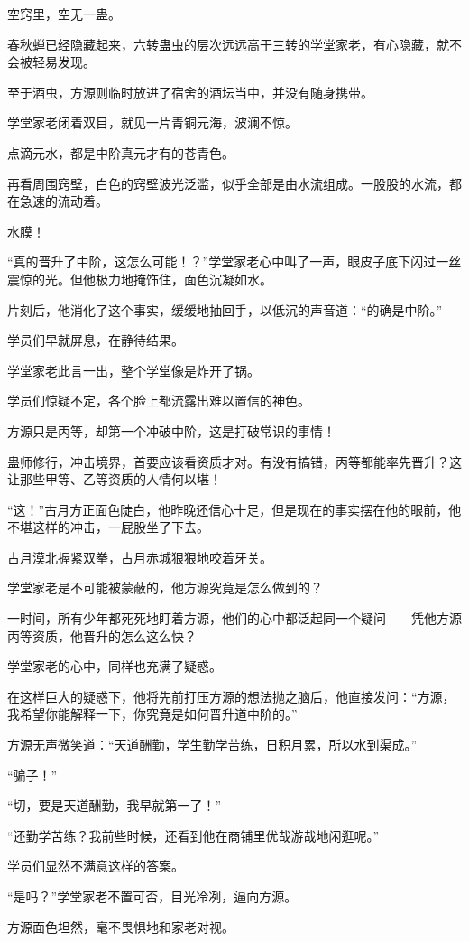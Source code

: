 \begin{this_body}
空窍里，空无一蛊。

春秋蝉已经隐藏起来，六转蛊虫的层次远远高于三转的学堂家老，有心隐藏，就不会被轻易发现。

至于酒虫，方源则临时放进了宿舍的酒坛当中，并没有随身携带。

学堂家老闭着双目，就见一片青铜元海，波澜不惊。

点滴元水，都是中阶真元才有的苍青色。

再看周围窍壁，白色的窍壁波光泛滥，似乎全部是由水流组成。一股股的水流，都在急速的流动着。

水膜！

“真的晋升了中阶，这怎么可能！？”学堂家老心中叫了一声，眼皮子底下闪过一丝震惊的光。但他极力地掩饰住，面色沉凝如水。

片刻后，他消化了这个事实，缓缓地抽回手，以低沉的声音道：“的确是中阶。”

学员们早就屏息，在静待结果。

学堂家老此言一出，整个学堂像是炸开了锅。

学员们惊疑不定，各个脸上都流露出难以置信的神色。

方源只是丙等，却第一个冲破中阶，这是打破常识的事情！

蛊师修行，冲击境界，首要应该看资质才对。有没有搞错，丙等都能率先晋升？这让那些甲等、乙等资质的人情何以堪！

“这！”古月方正面色陡白，他昨晚还信心十足，但是现在的事实摆在他的眼前，他不堪这样的冲击，一屁股坐了下去。

古月漠北握紧双拳，古月赤城狠狠地咬着牙关。

学堂家老是不可能被蒙蔽的，他方源究竟是怎么做到的？

一时间，所有少年都死死地盯着方源，他们的心中都泛起同一个疑问――凭他方源丙等资质，他晋升的怎么这么快？

学堂家老的心中，同样也充满了疑惑。

在这样巨大的疑惑下，他将先前打压方源的想法抛之脑后，他直接发问：“方源，我希望你能解释一下，你究竟是如何晋升道中阶的。”

方源无声微笑道：“天道酬勤，学生勤学苦练，日积月累，所以水到渠成。”

“骗子！”

“切，要是天道酬勤，我早就第一了！”

“还勤学苦练？我前些时候，还看到他在商铺里优哉游哉地闲逛呢。”

学员们显然不满意这样的答案。

“是吗？”学堂家老不置可否，目光冷冽，逼向方源。

方源面色坦然，毫不畏惧地和家老对视。


\end{this_body}
